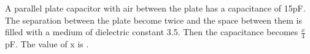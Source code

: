 \item A parallel plate capacitor with air between the plate has a capacitance of 15pF. The separation between the plate become twice and the space between them is filled with a medium of dielectric constant 3.5. Then the capacitance becomes $\frac{x}{4}$ pF. The value of x is \underline{\hspace{2.5cm}}.